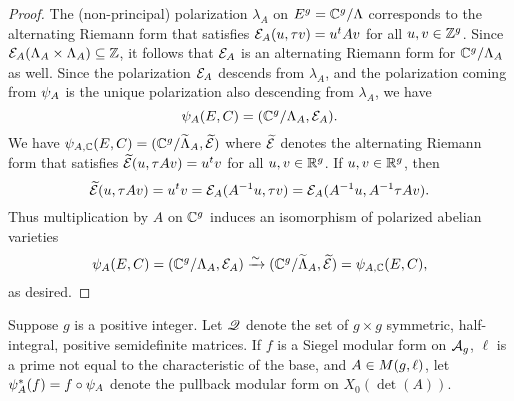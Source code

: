 \documentclass{amsart}
\begin{document}
\begin{proof}
The (non-principal) polarization $\lambda_A$ on $E^g = \mathbb{C}^g/\Lambda$ corresponds to the alternating Riemann form that satisfies $\mathcal{E}_A(u,\tau v) = u^tAv$ for all $u,v \in \mathbb{Z}^g$. Since $\mathcal{E}_A(\Lambda_A \times \Lambda_A) \subseteq \mathbb{Z}$, it follows that $\mathcal{E}_A$ is an alternating Riemann form for $\mathbb{C}^g/\Lambda_A$ as well. 
Since the polarization $\mathcal{E}_A$ descends from $\lambda_A$, and the polarization coming from $\psi_{A}$ is the unique polarization also descending from $\lambda_A$, we have
\[
  \psi_{A}(E,C) = (\mathbb{C}^g/\Lambda_A, \mathcal{E}_A).
\]
We have ${\psi}_{A, \mathbb{C}}(E,C) = (\mathbb{C}^g/\widetilde{\Lambda}_A, \widetilde{\mathcal{E}})$ where
 $\widetilde{\mathcal{E}}$ denotes the %
alternating Riemann form %
that satisfies %
$\widetilde{\mathcal{E}}(u, \tau A v) = u^tv$ for all $u,v \in \mathbb{R}^g$. If $u, v \in \mathbb{R}^g$, then
$$  \widetilde{\mathcal{E}}(u, \tau A v) = u^tv 
                          = \mathcal{E}_A(A^{-1}u, \tau v) 
                          = \mathcal{E}_{A}(A^{-1}u, A^{-1}\tau Av).$$
Thus multiplication by $A$ on $\mathbb{C}^g$ induces an isomorphism of polarized abelian varieties
\[
  \psi_{A}(E,C) = (\mathbb{C}^g/\Lambda_A, \mathcal{E}_A) \xrightarrow{\sim} (\mathbb{C}^g/\widetilde{\Lambda}_A, \widetilde{\mathcal{E}}) = {\psi}_{A, \mathbb{C}}(E,C),
\]
as desired.
\end{proof}

Suppose $g$ is a positive integer.
   Let $\mathscr{Q}$ denote the set of $g \times g$ symmetric, half-integral, positive semidefinite matrices. 
   If $f$ is a Siegel modular form on $\mathcal{A}_g$, $\ell$ is a prime not equal to the characteristic of the base, and $A\in M(g,\ell)$, let $\psi_{A}^*(f) = f \circ \psi_{A}$ denote the pullback modular form on $X_0(\det(A))$.
\end{document}
